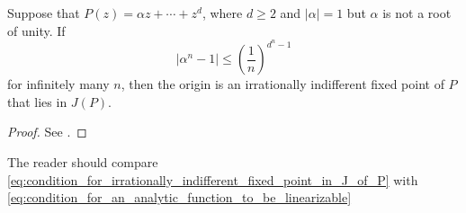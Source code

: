 \begin{theorem}
    \label{thm:condition_for_irrationally_indifferent_fixed_point_in_J_of_P}
    Suppose that $P(z) = \alpha z + \cdots + z^d$, where $d \geq 2$ and
    $|\alpha| = 1$ but $\alpha$ is not a root of unity. If
    \begin{equation}
        \label{eq:condition_for_irrationally_indifferent_fixed_point_in_J_of_P}
        |\alpha^n - 1| \leq \left(\frac{1}{n}\right)^{d^n - 1}
    \end{equation}
    for infinitely many $n$, then the origin is an irrationally indifferent
    fixed point of $P$ that lies in $J(P)$.
\end{theorem}
\begin{proof}
    See \cite[143]{Beardon1991}.
\end{proof}

\begin{remark}
    The reader should compare \eqref{eq:condition_for_irrationally_indifferent_fixed_point_in_J_of_P} with
    \eqref{eq:condition_for_an_analytic_function_to_be_linearizable}
\end{remark}

